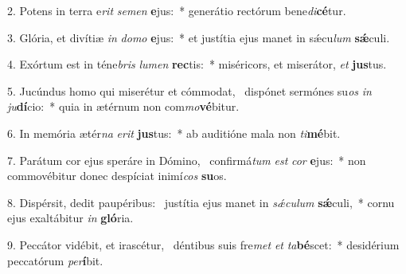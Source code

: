 2. Potens in terra e\textit{rit} \textit{se}\textit{men} \textbf{e}jus:~*  generátio rectórum bene\textit{di}\textbf{cé}tur.\

3. Glória, et divítiæ \textit{in} \textit{do}\textit{mo} \textbf{e}jus:~*  et justítia ejus manet in sǽcu\textit{lum} \textbf{sǽ}culi.\

4. Exórtum est in téne\textit{bris} \textit{lu}\textit{men} \textbf{rec}tis:~*  miséricors, et miserátor, \textit{et} \textbf{jus}tus.\

5. Jucúndus homo qui miserétur et cómmodat, \dag\  dispónet sermónes su\textit{os} \textit{in} \textit{ju}\textbf{dí}cio:~*  quia in ætérnum non com\textit{mo}\textbf{vé}bitur.\

6. In memória ætér\textit{na} \textit{e}\textit{rit} \textbf{jus}tus:~*  ab auditióne mala non \textit{ti}\textbf{mé}bit.\

7. Parátum cor ejus speráre in Dómino, \dag\  confirmá\textit{tum} \textit{est} \textit{cor} \textbf{e}jus:~*  non commovébitur donec despíciat inimí\textit{cos} \textbf{su}os.\

8. Dispérsit, dedit paupéribus: \dag\  justítia ejus manet in \textit{sǽ}\textit{cu}\textit{lum} \textbf{sǽ}culi,~*  cornu ejus exaltábitur \textit{in} \textbf{gló}ria.\

9. Peccátor vidébit, et irascétur, \dag\  déntibus suis fre\textit{met} \textit{et} \textit{ta}\textbf{bé}scet:~*  desidérium peccatórum \textit{per}\textbf{í}bit.\

